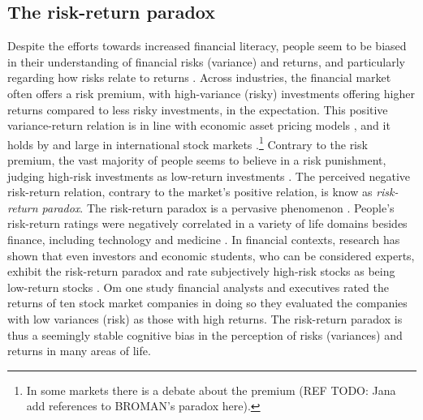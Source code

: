 \documentclass[a4paper,man, natbib,floatsintext]{apa6} %
\begin{document}
\subsection{The risk-return paradox} Despite the efforts towards increased financial literacy, people seem to be biased in their understanding of financial risks (variance) and returns, and particularly regarding how risks relate to  returns \citep{Shefrin1995,Ganzach2000,Kempf2014}. Across industries, the financial market often offers a risk premium, with high-variance (risky) investments offering higher returns compared to less risky investments, in the expectation. This positive variance-return relation is in line with economic asset pricing models \citep[][]{Markowitz1952}, and it holds by and large in international stock markets \citep[][]{Dimson2003}.\footnote{In some markets there is a debate about the premium (REF TODO: Jana add references to BROMAN's paradox here).} Contrary to the risk premium, the vast majority of people seems to believe in a risk punishment, judging high-risk investments as low-return investments \citep[][]{Shefrin1995, Shefrin2000, Shefrin2001, Kempf2014, Ganzach2000}. The perceived negative risk-return relation, contrary to the market's positive relation, is know as \textit{risk-return paradox}. The risk-return paradox is a pervasive phenomenon \citep{Kempf2014,Ganzach2000}. People's risk-return ratings were negatively correlated in a variety of life domains besides finance, including technology and medicine \citep[e.g.][]{Fischhoff1978, Alhakami1994,Sokolowska2015,Fleming2012}. In financial contexts, research has shown that even investors and economic students, who can be considered experts, exhibit the risk-return paradox and rate subjectively high-risk stocks as being low-return stocks \citep{Kempf2014}. Om one study \citep{Shefrin1995} financial analysts and executives rated the returns of ten stock market companies in doing so they evaluated the companies with low variances (risk) as those with high returns.
The risk-return paradox is thus a seemingly stable cognitive bias in the perception of risks (variances) and returns in many areas of life.
\end{document}
